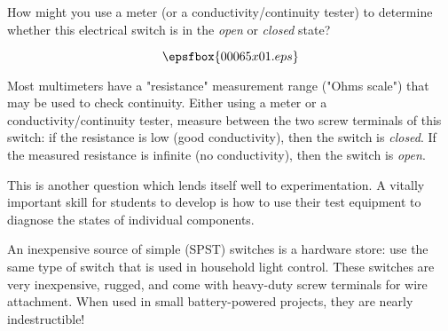 

How might you use a meter (or a conductivity/continuity tester) to determine whether this electrical switch is in the {\it open} or {\it closed} state?

$$\epsfbox{00065x01.eps}$$







Most multimeters have a "resistance" measurement range ("Ohms scale") that may be used to check continuity.  Either using a meter or a conductivity/continuity tester, measure between the two screw terminals of this switch: if the resistance is low (good conductivity), then the switch is {\it closed}.  If the measured resistance is infinite (no conductivity), then the switch is {\it open}.







This is another question which lends itself well to experimentation.  A vitally important skill for students to develop is how to use their test equipment to diagnose the states of individual components.

An inexpensive source of simple (SPST) switches is a hardware store: use the same type of switch that is used in household light control.  These switches are very inexpensive, rugged, and come with heavy-duty screw terminals for wire attachment.  When used in small battery-powered projects, they are nearly indestructible!




